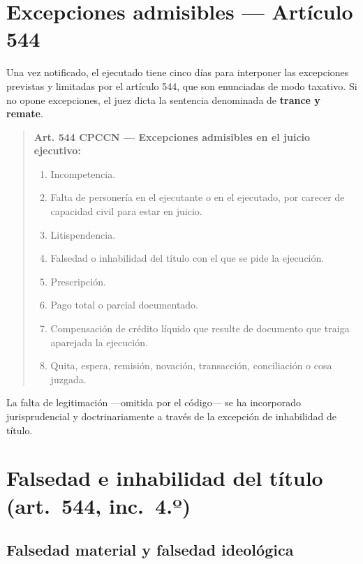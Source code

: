 \documentclass[12pt,oneside]{book}
\begin{document}
\section{Excepciones admisibles --- Artículo 544}

Una vez notificado, el ejecutado tiene cinco días para interponer las excepciones previstas y limitadas por el artículo 544, que son enunciadas de modo taxativo. Si no opone excepciones, el juez dicta la sentencia denominada de \textbf{trance y remate}.

\begin{quote}
\textbf{Art. 544 CPCCN --- Excepciones admisibles en el juicio ejecutivo:}
\begin{enumerate}[label=\arabic*.º),leftmargin=2.2em]
    \item Incompetencia.
    \item Falta de personería en el ejecutante o en el ejecutado, por carecer de capacidad civil para estar en juicio.
    \item Litispendencia.
    \item Falsedad o inhabilidad del título con el que se pide la ejecución.
    \item Prescripción.
    \item Pago total o parcial documentado.
    \item Compensación de crédito líquido que resulte de documento que traiga aparejada la ejecución.
    \item Quita, espera, remisión, novación, transacción, conciliación o cosa juzgada.
\end{enumerate}
\end{quote}

\begin{note}
La falta de legitimación ---omitida por el código--- se ha incorporado jurisprudencial y doctrinariamente a través de la excepción de inhabilidad de título.
\end{note}

\section{Falsedad e inhabilidad del título (art.~544, inc.~4.º)}

\subsection{Falsedad material y falsedad ideológica}
\end{document}
